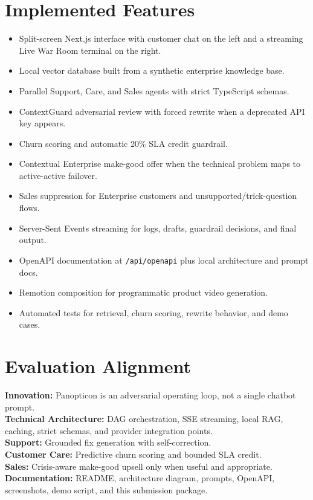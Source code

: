 \documentclass[11pt]{article}
\begin{document}
\section{Implemented Features}
\begin{itemize}
\item Split-screen Next.js interface with customer chat on the left and a streaming Live War Room terminal on the right.
\item Local vector database built from a synthetic enterprise knowledge base.
\item Parallel Support, Care, and Sales agents with strict TypeScript schemas.
\item ContextGuard adversarial review with forced rewrite when a deprecated API key appears.
\item Churn scoring and automatic 20\% SLA credit guardrail.
\item Contextual Enterprise make-good offer when the technical problem maps to active-active failover.
\item Sales suppression for Enterprise customers and unsupported/trick-question flows.
\item Server-Sent Events streaming for logs, drafts, guardrail decisions, and final output.
\item OpenAPI documentation at \texttt{/api/openapi} plus local architecture and prompt docs.
\item Remotion composition for programmatic product video generation.
\item Automated tests for retrieval, churn scoring, rewrite behavior, and demo cases.
\end{itemize}

\section{Evaluation Alignment}
\begin{tcolorbox}[colback=white,colframe=ink,arc=2mm,boxrule=0.6pt]
\textbf{Innovation:} Panopticon is an adversarial operating loop, not a single chatbot prompt.\\
\textbf{Technical Architecture:} DAG orchestration, SSE streaming, local RAG, caching, strict schemas, and provider integration points.\\
\textbf{Support:} Grounded fix generation with self-correction.\\
\textbf{Customer Care:} Predictive churn scoring and bounded SLA credit.\\
\textbf{Sales:} Crisis-aware make-good upsell only when useful and appropriate.\\
\textbf{Documentation:} README, architecture diagram, prompts, OpenAPI, screenshots, demo script, and this submission package.
\end{tcolorbox}
\end{document}
